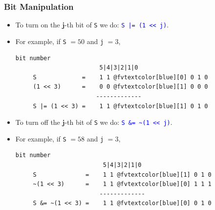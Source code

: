 \documentclass{beamer}
\begin{document}
\begin{frame}[fragile]
\frametitle{Bit Manipulation}

\scriptsize

\begin{itemize}

\item To turn on the $\mathbf{j}$-th bit of \verb+S+ we do: \textcolor{blue}{\texttt{S |= (1 << j)}}.

\vspace{0.1cm}

\item For example, if \verb+S+ $= 50$ and \verb+j+ $= 3$,

\begin{center}
\begin{Verbatim}[commandchars=@\[\]]
                         bit number
                        5|4|3|2|1|0
     S             =    1 1 @fvtextcolor[blue][0] 0 1 0
     (1 << 3)      =    0 0 @fvtextcolor[blue][1] 0 0 0
                       -------------
     S |= (1 << 3) =    1 1 @fvtextcolor[blue][1] 0 1 0
\end{Verbatim}
\end{center}

\vspace{0.3cm}

\item To turn off the $\mathbf{j}$-th bit of \verb+S+ we do: \textcolor{blue}{\texttt{S \&= \textasciitilde(1 << j)}}.

\vspace{0.1cm}

\item For example, if \verb+S+ $= 58$ and \verb+j+ $= 3$,

\begin{center}
\begin{Verbatim}[commandchars=@\[\]]
                          bit number
                         5|4|3|2|1|0
     S              =    1 1 @fvtextcolor[blue][1] 0 1 0
     ~(1 << 3)      =    1 1 @fvtextcolor[blue][0] 1 1 1
                        -------------
     S &= ~(1 << 3) =    1 1 @fvtextcolor[blue][0] 0 1 0
\end{Verbatim}
\end{center}

\end{itemize}

\end{frame}
\end{document}
